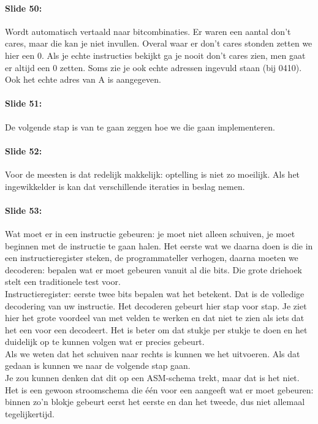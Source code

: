 \documentclass[10pt,a4paper]{book}
\begin{document}
\paragraph{Slide 50:} Wordt automatisch vertaald naar bitcombinaties. Er waren een aantal don't cares, maar die kan je niet invullen. Overal waar er don't cares stonden zetten we hier een 0. Als je echte instructies bekijkt ga je nooit don't cares zien, men gaat er altijd een 0 zetten. Soms zie je ook echte adressen ingevuld staan (bij 0410). Ook het echte adres van A is aangegeven.

\paragraph{Slide 51:} De volgende stap is van te gaan zeggen hoe we die gaan implementeren.

\paragraph{Slide 52:} Voor de meesten is dat redelijk makkelijk: optelling is niet zo moeilijk. Als het ingewikkelder is kan dat verschillende iteraties in beslag nemen. 

\paragraph{Slide 53:} Wat moet er in een instructie gebeuren: je moet niet alleen schuiven, je moet beginnen met de instructie te gaan halen. Het eerste wat we daarna doen is die in een instructieregister steken, de programmateller verhogen, daarna moeten we decoderen: bepalen wat er moet gebeuren vanuit al die bits. Die grote driehoek stelt een traditionele test voor.\\
Instructieregister: eerste twee bits bepalen wat het betekent. Dat is de volledige decodering van uw instructie. Het decoderen gebeurt hier stap voor stap. Je ziet hier het grote voordeel van met velden te werken en dat niet te zien als iets dat het een voor een decodeert. Het is beter om dat stukje per stukje te doen en het duidelijk op te kunnen volgen wat er precies gebeurt.\\
Als we weten dat het schuiven naar rechts is kunnen we het uitvoeren. Als dat gedaan is kunnen we naar de volgende stap gaan.\\
Je zou kunnen denken dat dit op een ASM-schema trekt, maar dat is het niet. Het is een gewoon stroomschema die \'e\'en voor een aangeeft wat er moet gebeuren: binnen zo'n blokje gebeurt eerst het eerste en dan het tweede, dus niet allemaal tegelijkertijd.
\end{document}
